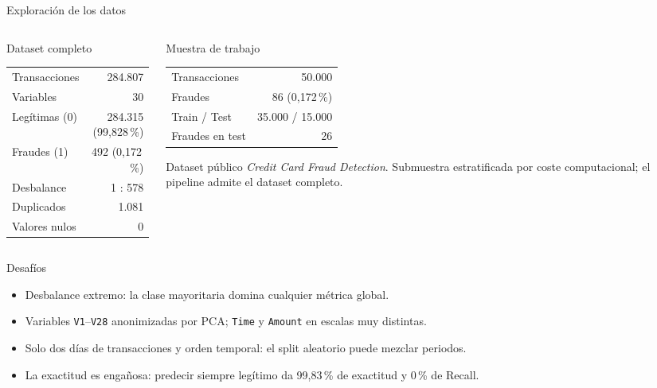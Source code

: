 \documentclass[aspectratio=169,11pt]{beamer}
\begin{document}
\begin{frame}{Exploración de los datos}
  \begin{columns}[T]
    \begin{column}{0.48\textwidth}
      \begin{block}{Dataset completo}
        \scriptsize
        \begin{tabular}{@{}lr@{}}
          \toprule
          Transacciones & 284.807 \\
          Variables & 30 \\
          Legítimas (0) & 284.315 (99,828\,\%) \\
          Fraudes (1) & 492 (0,172\,\%) \\
          Desbalance & 1 : 578 \\
          Duplicados & 1.081 \\
          Valores nulos & 0 \\
          \bottomrule
        \end{tabular}
      \end{block}
    \end{column}
    \begin{column}{0.48\textwidth}
      \begin{block}{Muestra de trabajo}
        \scriptsize
        \begin{tabular}{@{}lr@{}}
          \toprule
          Transacciones & 50.000 \\
          Fraudes & 86 (0,172\,\%) \\
          Train / Test & 35.000 / 15.000 \\
          Fraudes en test & 26 \\
          \bottomrule
        \end{tabular}
      \end{block}
      \vspace{0.1cm}
      {\scriptsize Dataset público \textit{Credit Card Fraud Detection}.
      Submuestra estratificada por coste computacional; el pipeline
      admite el dataset completo.}
    \end{column}
  \end{columns}

  \vspace{0.12cm}
  \begin{block}{Desafíos}
    \scriptsize
    \begin{itemize}
      \item Desbalance extremo: la clase mayoritaria domina cualquier
            métrica global.
      \item Variables \texttt{V1}--\texttt{V28} anonimizadas por PCA;
            \texttt{Time} y \texttt{Amount} en escalas muy distintas.
      \item Solo dos días de transacciones y orden temporal: el split
            aleatorio puede mezclar periodos.
      \item La exactitud es engañosa: predecir siempre legítimo da
            99,83\,\% de exactitud y 0\,\% de Recall.
    \end{itemize}
  \end{block}
\end{frame}
\end{document}
